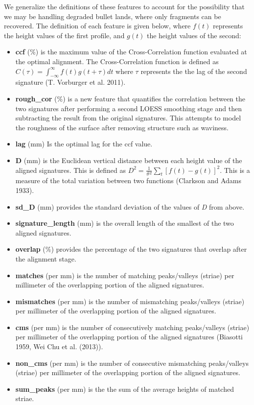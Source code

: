 \documentclass[12pt,]{article}
\providecommand{\tightlist}{%
  \setlength{\itemsep}{0pt}\setlength{\parskip}{0pt}}
\theoremstyle{definition}
\theoremstyle{definition}
\theoremstyle{definition}
\theoremstyle{remark}
\begin{document}
We generalize the definitions of these features to account for the
possibility that we may be handling degraded bullet lands, where only
fragments can be recovered. The definition of each feature is given
below, where \(f(t)\) represents the height values of the first profile,
and \(g(t)\) the height values of the second:

\begin{itemize}
\tightlist
\item
  \textbf{ccf} (\%) is the maximum value of the Cross-Correlation
  function evaluated at the optimal alignment. The Cross-Correlation
  function is defined as
  \(C(\tau) = \int_{-\infty}^{\infty} f(t)g(t + \tau)dt\) where \(\tau\)
  represents the the lag of the second signature (T. Vorburger et al.
  2011).
\item
  \textbf{rough\_cor} (\%) is a new feature that quantifies the
  correlation between the two signatures after performing a second LOESS
  smoothing stage and then subtracting the result from the original
  signatures. This attempts to model the roughness of the surface after
  removing structure such as waviness.
\item
  \textbf{lag} (mm) Is the optimal lag for the ccf value.
\item
  \textbf{D} (mm) is the Euclidean vertical distance between each height
  value of the aligned signatures. This is defined as
  \(D^2 = \frac{1}{\text{\#}t}\sum_t \left[f(t) - g(t)\right]^2\). This
  is a measure of the total variation between two functions (Clarkson
  and Adams 1933).
\item
  \textbf{sd\_D} (mm) provides the standard deviation of the values of
  \emph{D} from above.
\item
  \textbf{signature\_length} (mm) is the overall length of the smallest
  of the two aligned signatures.
\item
  \textbf{overlap} (\%) provides the percentage of the two signatures
  that overlap after the alignment stage.
\item
  \textbf{matches} (per mm) is the number of matching peaks/valleys
  (striae) per millimeter of the overlapping portion of the aligned
  signatures.
\item
  \textbf{mismatches} (per mm) is the number of mismatching
  peaks/valleys (striae) per millimeter of the overlapping portion of
  the aligned signatures.
\item
  \textbf{cms} (per mm) is the number of consecutively matching
  peaks/valleys (striae) per millimeter of the overlapping portion of
  the aligned signatures (Biasotti 1959, Wei Chu et al. (2013)).
\item
  \textbf{non\_cms} (per mm) is the number of consecutive mismatching
  peaks/valleys (striae) per millimeter of the overlapping portion of
  the aligned signatures.
\item
  \textbf{sum\_peaks} (per mm) is the the sum of the average heights of
  matched striae.
\end{itemize}
\end{document}
